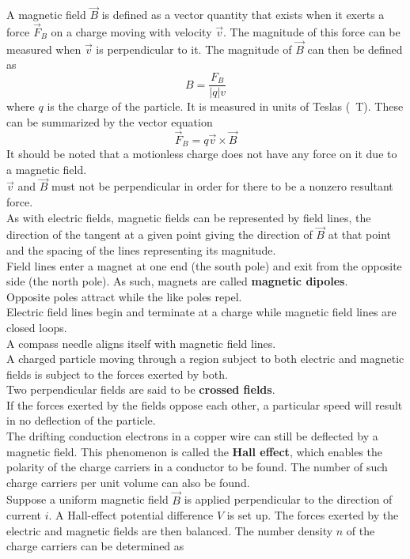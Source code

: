 \documentclass{subfiles}
\begin{document}
	A magnetic field \(\vec{B}\) is defined as a vector quantity that exists when it exerts a force \(\vec{F}_B\) on a charge moving with velocity \(\vec{v}\). The magnitude of this force can be measured when \(\vec{v}\) is perpendicular to it. The magnitude of \(\vec{B}\) can then be defined as
		\[B = \frac{F_B}{|q|v} \tag{magnitude of magnetic field}\]
		where \(q\) is the charge of the particle. It is measured in units of Teslas (\SI{}{T}).
		These can be summarized by the vector equation
		\[\vec{F}_B = q\vec{v} \times \vec{B} \tag{magnetic force}\]
		It should be noted that a motionless charge does not have any force on it due to a magnetic field. \\
		\(\vec{v}\) and \(\vec{B}\) must not be perpendicular in order for there to be a nonzero resultant force. \\
	As with electric fields, magnetic fields can be represented by field lines, the direction of the tangent at a given point giving the direction of \(\vec{B}\) at that point and the spacing of the lines representing its magnitude. \\
	Field lines enter a magnet at one end (the south pole) and exit from the opposite side (the north pole). As such, magnets are called \textbf{magnetic dipoles}. \\
		Opposite poles attract while the like poles repel. \\
	Electric field lines begin and terminate at a charge while magnetic field lines are closed loops. \\
	A compass needle aligns itself with magnetic field lines. \\
	A charged particle moving through a region subject to both electric and magnetic fields is subject to the forces exerted by both. \\
		Two perpendicular fields are said to be \textbf{crossed fields}. \\
		If the forces exerted by the fields oppose each other, a particular speed will result in no deflection of the particle. \\
	The drifting conduction electrons in a copper wire can still be deflected by a magnetic field. This phenomenon is called the \textbf{Hall effect}, which enables the polarity of the charge carriers in a conductor to be found. The number of such charge carriers per unit volume can also be found. \\
	Suppose a uniform magnetic field \(\vec{B}\) is applied perpendicular to the direction of current \(i\). A Hall-effect potential difference \(V\) is set up. The forces exerted by the electric and magnetic fields are then balanced. The number density \(n\) of the charge carriers can be determined as
\end{document}
